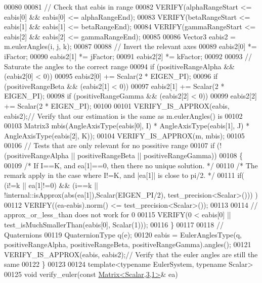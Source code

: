 \begin{DoxyCode}
00080   
00081   \textcolor{comment}{// Check that eabis in range}
00082   VERIFY(alphaRangeStart <= eabis[0] && eabis[0] <= alphaRangeEnd);
00083   VERIFY(betaRangeStart <= eabis[1] && eabis[1] <= betaRangeEnd);
00084   VERIFY(gammaRangeStart <= eabis[2] && eabis[2] <= gammaRangeEnd);
00085   
00086   Vector3 eabis2 = m.eulerAngles(i, j, k);
00087   
00088   \textcolor{comment}{// Invert the relevant axes}
00089   eabis2[0] *= iFactor;
00090   eabis2[1] *= jFactor;
00091   eabis2[2] *= kFactor;
00092   
00093   \textcolor{comment}{// Saturate the angles to the correct range}
00094   \textcolor{keywordflow}{if} (positiveRangeAlpha && (eabis2[0] < 0))
00095     eabis2[0] += Scalar(2 * EIGEN\_PI);
00096   \textcolor{keywordflow}{if} (positiveRangeBeta && (eabis2[1] < 0))
00097     eabis2[1] += Scalar(2 * EIGEN\_PI);
00098   \textcolor{keywordflow}{if} (positiveRangeGamma && (eabis2[2] < 0))
00099     eabis2[2] += Scalar(2 * EIGEN\_PI);
00100   
00101   VERIFY\_IS\_APPROX(eabis, eabis2);\textcolor{comment}{// Verify that our estimation is the same as m.eulerAngles() is}
00102   
00103   Matrix3 mbis(AngleAxisType(eabis[0], I) * AngleAxisType(eabis[1], J) * AngleAxisType(eabis[2], K));
00104   VERIFY\_IS\_APPROX(m,  mbis);
00105   
00106   \textcolor{comment}{// Tests that are only relevant for no possitive range}
00107   \textcolor{keywordflow}{if} (!(positiveRangeAlpha || positiveRangeBeta || positiveRangeGamma))
00108   \{
00109     \textcolor{comment}{/* If I==K, and ea[1]==0, then there no unique solution. */} 
00110     \textcolor{comment}{/* The remark apply in the case where I!=K, and |ea[1]| is close to pi/2. */} 
00111     \textcolor{keywordflow}{if}( (i!=k || ea[1]!=0) && (i==k || !internal::isApprox(abs(ea[1]),Scalar(EIGEN\_PI/2),
      test\_precision<Scalar>())) ) 
00112       VERIFY((ea-eabis).norm() <= test\_precision<Scalar>());
00113     
00114     \textcolor{comment}{// approx\_or\_less\_than does not work for 0}
00115     VERIFY(0 < eabis[0] || test\_isMuchSmallerThan(eabis[0], Scalar(1)));
00116   \}
00117   
00118   \textcolor{comment}{// Quaternions}
00119   QuaternionType q(e);
00120   eabis = EulerAnglesType(q, positiveRangeAlpha, positiveRangeBeta, positiveRangeGamma).angles();
00121   VERIFY\_IS\_APPROX(eabis, eabis2);\textcolor{comment}{// Verify that the euler angles are still the same}
00122 \}
00123 
00124 \textcolor{keyword}{template}<\textcolor{keyword}{typename} EulerSystem, \textcolor{keyword}{typename} Scalar>
00125 \textcolor{keywordtype}{void} verify\_euler(\textcolor{keyword}{const} \hyperlink{group___core___module}{Matrix<Scalar,3,1>}& ea)

\end{DoxyCode}
